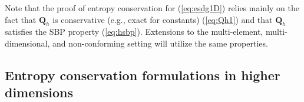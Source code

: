 \documentclass{svjour3}                     %
\renewcommand{\tilde}{\widetilde}
\newcommand{\LRp}[1]{\left( #1 \right)}
\renewcommand{\note}[1]{{\color{blue}{#1}}}
\begin{document}
Note that the proof of entropy conservation for (\ref{eq:esdg1D}) relies mainly on the fact that $\bm{Q}_h$ is conservative (e.g., exact for constants) (\ref{eq:Qh1}) and that $\bm{Q}_h$ satisfies the SBP property (\ref{eq:hsbp}).  Extensions to the multi-element, multi-dimensional, and non-conforming setting will utilize the same properties.  




\subsection{Entropy conservation formulations in higher dimensions}
\end{document}
